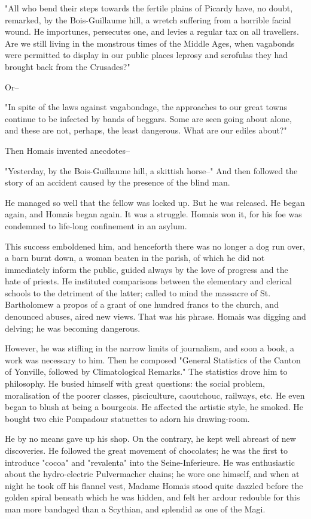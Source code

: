 \documentclass{tufte-book}
\begin{document}
"All who bend their steps towards the fertile plains of Picardy have, no
doubt, remarked, by the Bois-Guillaume hill, a wretch suffering from
a horrible facial wound. He importunes, persecutes one, and levies a
regular tax on all travellers. Are we still living in the monstrous
times of the Middle Ages, when vagabonds were permitted to display in
our public places leprosy and scrofulas they had brought back from the
Crusades?"

Or--

"In spite of the laws against vagabondage, the approaches to our great
towns continue to be infected by bands of beggars. Some are seen going
about alone, and these are not, perhaps, the least dangerous. What are
our ediles about?"

Then Homais invented anecdotes--

"Yesterday, by the Bois-Guillaume hill, a skittish horse--" And then
followed the story of an accident caused by the presence of the blind
man.

He managed so well that the fellow was locked up. But he was released.
He began again, and Homais began again. It was a struggle. Homais won
it, for his foe was condemned to life-long confinement in an asylum.

This success emboldened him, and henceforth there was no longer a dog
run over, a barn burnt down, a woman beaten in the parish, of which
he did not immediately inform the public, guided always by the love of
progress and the hate of priests. He instituted comparisons between the
elementary and clerical schools to the detriment of the latter; called
to mind the massacre of St. Bartholomew a propos of a grant of one
hundred francs to the church, and denounced abuses, aired new views.
That was his phrase. Homais was digging and delving; he was becoming
dangerous.

However, he was stifling in the narrow limits of journalism, and soon a
book, a work was necessary to him. Then he composed "General Statistics
of the Canton of Yonville, followed by Climatological Remarks." The
statistics drove him to philosophy. He busied himself with great
questions: the social problem, moralisation of the poorer classes,
pisciculture, caoutchouc, railways, etc. He even began to blush at being
a bourgeois. He affected the artistic style, he smoked. He bought two
chic Pompadour statuettes to adorn his drawing-room.

He by no means gave up his shop. On the contrary, he kept well abreast
of new discoveries. He followed the great movement of chocolates; he
was the first to introduce "cocoa" and "revalenta" into the
Seine-Inferieure. He was enthusiastic about the hydro-electric
Pulvermacher chains; he wore one himself, and when at night he took off
his flannel vest, Madame Homais stood quite dazzled before the golden
spiral beneath which he was hidden, and felt her ardour redouble for
this man more bandaged than a Scythian, and splendid as one of the Magi.
\end{document}
